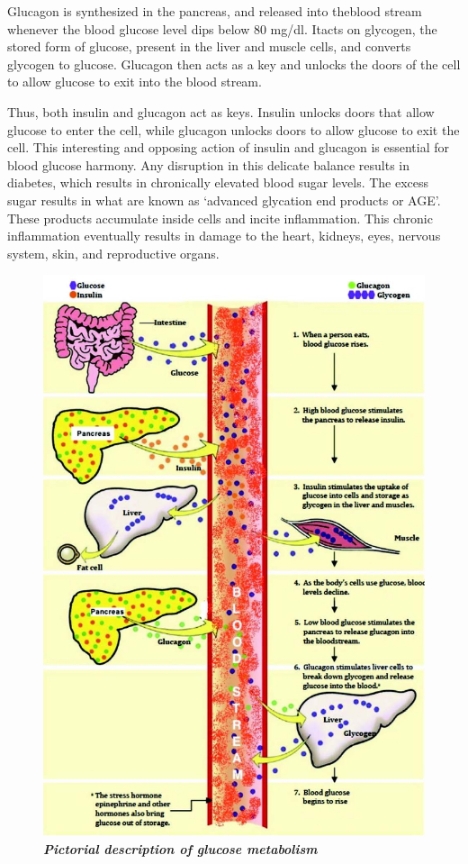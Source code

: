 \vskip 6pt
Glucagon is synthesized in the pancreas, and released into the\break blood stream whenever the blood glucose level dips below 80 mg/dl. It\break acts on glycogen, the stored form of glucose, present in the liver and muscle cells, and converts glycogen to glucose. Glucagon then acts as a key and unlocks the doors of the cell to allow glucose to exit into the blood stream.

\vskip 6pt
Thus, both insulin and glucagon act as keys. Insulin unlocks doors that allow glucose to enter the cell, while glucagon unlocks doors to allow glucose to exit the cell. This interesting and opposing action of insulin and glucagon is essential for blood glucose harmony. Any disruption in this delicate balance results in diabetes, which results in chronically elevated blood sugar levels. The excess sugar results in what are known as ‘advanced glycation end products or AGE’. These products accumulate inside cells and incite inflammation. This chronic inflammation eventually results in damage to the heart, kidneys, eyes, nervous system, skin, and reproductive organs.

\begin{figure}[h]
\centering
\includegraphics[scale=2.5]{images/018.jpg}\\
\textbf{\textit{Pictorial description of glucose metabolism}}
\end{figure}


